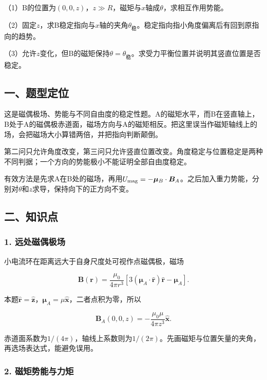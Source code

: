 \documentclass[12pt,a4paper,fontset=fandol]{ctexart}
\begin{document}
（1）B的位置为\((0,0,z)\)，\(z\gg R\)，磁矩与\(x\)轴成\(\theta\)，求相互作用势能。

（2）固定\(z\)，求B稳定指向与\(x\)轴的夹角\(\theta_{\text{稳}}\)。稳定指向指小角度偏离后有回到原指向的趋势。

（3）允许\(z\)变化，但B的磁矩保持\(\theta=\theta_{\text{稳}}\)。求受力平衡位置并说明其竖直位置是否稳定。

\subsection{一、题型定位}\label{ux4e00ux9898ux578bux5b9aux4f4d-3}

这是磁偶极场、势能与不同自由度的稳定性题。A的磁矩水平，而B在竖直轴上，B处于A的磁偶极赤道面，磁场方向与A的磁矩相反。把这里误当作磁矩轴线上的场，会把磁场大小算错两倍，并把指向判断颠倒。

第二问只允许角度改变，第三问只允许竖直位置改变。角度稳定与位置稳定是两种不同判据；一个方向的势能极小不能证明全部自由度稳定。

有效方法是先求A在B处的磁场，再用\(U_{\rm mag}=-\boldsymbol\mu_B\cdot\boldsymbol B_A\)。之后加入重力势能，分别对\(\theta\)和\(z\)求导，保持向下的正方向不变。

\subsection{二、知识点}\label{ux4e8cux77e5ux8bc6ux70b9-3}

\subsubsection{1.
远处磁偶极场}\label{ux8fdcux5904ux78c1ux5076ux6781ux573a}

小电流环在距离远大于自身尺度处可视作点磁偶极，磁场

\[
\boldsymbol B(\boldsymbol r)
=\frac{\mu_0}{4\pi r^3}
\left[3(\boldsymbol\mu_A\cdot\hat{\boldsymbol r})
\hat{\boldsymbol r}-\boldsymbol\mu_A\right].
\]

本题\(\hat{\boldsymbol r}=\hat{\boldsymbol z}\)，\(\boldsymbol\mu_A=\mu\hat{\boldsymbol x}\)，二者点积为零，所以

\[
\boldsymbol B_A(0,0,z)
=-\frac{\mu_0\mu}{4\pi z^3}\hat{\boldsymbol x}.
\]

赤道面系数为\(1/(4\pi)\)，轴线上系数则为\(1/(2\pi)\)。先画磁矩与位置矢量的夹角，再选场表达式，能避免误用。

\subsubsection{2.
磁矩势能与力矩}\label{ux78c1ux77e9ux52bfux80fdux4e0eux529bux77e9}
\end{document}
